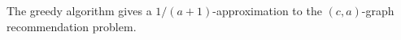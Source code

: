 \begin{thm}
The greedy algorithm gives a $1/(a+1)$-approximation to the $(c,a)$-graph
recommendation problem.
\end{thm}
%

